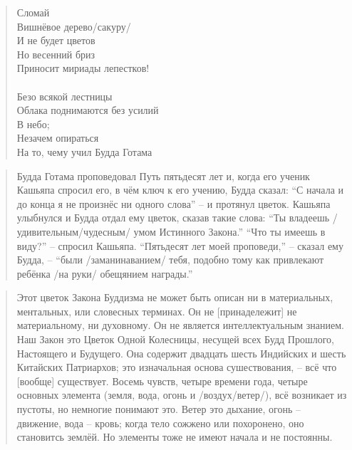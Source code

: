 \begin{ver}
  \begin{quote}
    \begin{verses}
      Сломай \\
      Вишнёвое дерево/сакуру/\\
      И не будет цветов\\
      Но весенний бриз\\
      Приносит мириады лепестков!\\
      \ \\
      Безо всякой лестницы\\
      Облака поднимаются без усилий\\
      В небо;\\
      Незачем опираться\\
      На то, чему учил Будда Готама\\
    \end{verses}
  \end{quote}
\end{ver}
\begin{ver}
  \begin{quote}
    Будда Готама проповедовал Путь пятьдесят лет и, когда его
    ученик Кашьяпа спросил его, в чём ключ к его учению, Будда сказал:
    ``С начала и до конца я не произнёс ни одного слова'' -- и протянул
    цветок. Кашьяпа улыбнулся и Будда отдал ему цветок, сказав такие
    слова: ``Ты владеешь /удивительным/чудесным/ умом Истинного
    Закона.''
    ``Что ты имеешь в виду?'' -- спросил Кашьяпа. ``Пятьдесят лет моей
    проповеди,'' -- сказал ему Будда, -- ``были /заманинаванием/ тебя,
    подобно тому как привлекают ребёнка /на руки/ обещянием награды.''
  \end{quote}
\end{ver}

\begin{ver}
  \begin{quote}
    Этот цветок Закона Буддизма не может быть описан ни в
    материальных, ментальных, или словесных
    терминах. Он не [принадележит] не материальному, ни духовному. Он
    не является интеллектуальным знанием. Наш Закон это Цветок Одной
    Колесницы, несущей всех Будд Прошлого, Настоящего и Будущего. Она
    содержит двадцать шесть Индийских и шесть Китайских Патриархов;
    это изначальная основа сушествования, -- всё что [вообще]
    существует.
    Восемь чувств, четыре времени года, четыре основных элемента
    (земля, вода, огонь и /воздух/ветер/), всё возникает из пустоты, но
    немногие понимают это. Ветер это дыхание, огонь -- движение, вода
    -- кровь; когда тело сожжено или похоронено, оно становитсь
    землёй. Но элементы тоже не имеют начала и не постоянны.
  \end{quote}
\end{ver}

